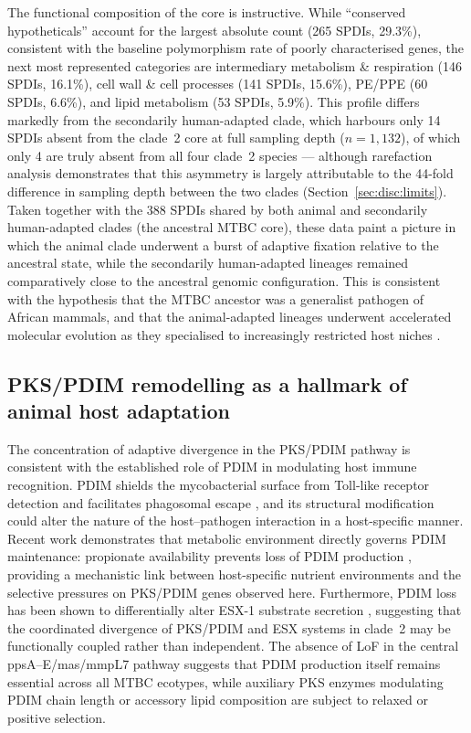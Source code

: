 \documentclass[11pt,a4paper]{article}
\begin{document}
The functional composition of the core is instructive.
%
While ``conserved hypotheticals'' account for the largest absolute count
(265 SPDIs, 29.3\%), consistent with the baseline polymorphism rate of
poorly characterised genes, the next most represented categories are
intermediary metabolism \& respiration (146 SPDIs, 16.1\%), cell wall
\& cell processes (141 SPDIs, 15.6\%), PE/PPE (60 SPDIs, 6.6\%), and lipid
metabolism (53 SPDIs, 5.9\%).
%
This profile differs markedly from the secondarily human-adapted clade, which harbours
only 14 SPDIs absent from the clade~2 core at full sampling depth
($n = 1{,}132$), of which only 4 are truly absent from all four clade~2
species --- although rarefaction
analysis demonstrates that this asymmetry is largely attributable to the
44-fold difference in sampling depth between the two clades
(Section~\ref{sec:disc:limits}).
%
Taken together with the 388 SPDIs shared by both animal and secondarily human-adapted clades
(the ancestral MTBC core), these data paint a picture in which the animal clade
underwent a burst of adaptive fixation relative to the ancestral state, while
the secondarily human-adapted lineages remained comparatively close to the ancestral genomic
configuration.
%
This is consistent with the hypothesis that the MTBC ancestor was a generalist
pathogen of African mammals, and that the animal-adapted lineages underwent
accelerated molecular evolution as they specialised to increasingly restricted
host niches \cite{Comas2013, Boritsch2016}.

\subsection{PKS/PDIM remodelling as a hallmark of animal host adaptation}
\label{sec:disc:pks}

The concentration of adaptive divergence in the PKS/PDIM pathway is consistent
with the established role of PDIM in modulating host immune recognition.
%
PDIM shields the mycobacterial surface from Toll-like receptor detection and
facilitates phagosomal escape \cite{Camacho2001, Rousseau2004}, and its
structural modification could alter the nature of the host--pathogen interaction
in a host-specific manner.
%
Recent work demonstrates that metabolic environment directly governs PDIM
maintenance: propionate availability prevents loss of PDIM production
\cite{Mulholland2024}, providing a mechanistic link between host-specific
nutrient environments and the selective pressures on PKS/PDIM genes observed
here. Furthermore, PDIM loss has been shown to differentially alter ESX-1
substrate secretion \cite{vanWijk2024}, suggesting that the coordinated
divergence of PKS/PDIM and ESX systems in clade~2 may be
functionally coupled rather than independent.
%
The absence of LoF in the central ppsA--E/mas/mmpL7 pathway suggests that PDIM
production itself remains essential across all MTBC ecotypes, while auxiliary
PKS enzymes modulating PDIM chain length or accessory lipid composition are
subject to relaxed or positive selection.
\end{document}
